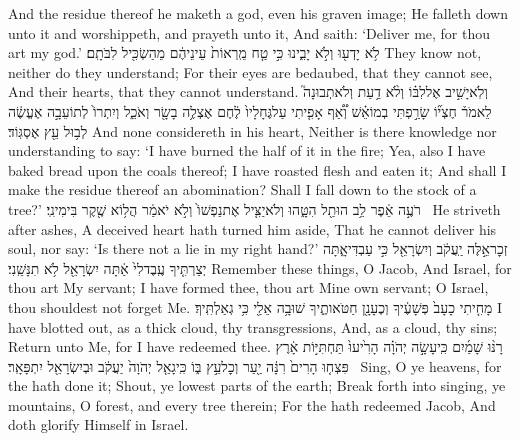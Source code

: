{And the residue thereof he maketh a god, even his graven image; He falleth down unto it and worshippeth, and prayeth unto it, And saith: ‘Deliver me, for thou art my god.’}
{לֹ֥א יָדְע֖וּ וְלֹ֣א יָבִ֑ינוּ כִּ֣י טַ֤ח מֵֽרְאוֹת֙ עֵינֵיהֶ֔ם מֵהַשְׂכִּ֖יל לִבֹּתָֽם׃}
{They know not, neither do they understand; For their eyes are bedaubed, that they cannot see, And their hearts, that they cannot understand.}
{וְלֹֽא\maqqaf יָשִׁ֣יב אֶל\maqqaf לִבּ֗וֹ וְלֹ֨א דַ֥עַת וְלֹא\maqqaf תְבוּנָה֮ לֵאמֹר֒ חֶצְי֞וֹ שָׂרַ֣פְתִּי בְמוֹ\maqqaf אֵ֗שׁ וְ֠אַ֠ף אָפִ֤יתִי עַל\maqqaf גֶּחָלָיו֙ לֶ֔חֶם אֶצְלֶ֥ה בָשָׂ֖ר וְאֹכֵ֑ל וְיִתְרוֹ֙ לְתוֹעֵבָ֣ה אֶעֱשֶׂ֔ה לְב֥וּל עֵ֖ץ אֶסְגּֽוֹד׃}
{And none considereth in his heart, Neither is there knowledge nor understanding to say: ‘I have burned the half of it in the fire; Yea, also I have baked bread upon the coals thereof; I have roasted flesh and eaten it; And shall I make the residue thereof an abomination? Shall I fall down to the stock of a tree?’}
{רֹעֶ֣ה אֵ֔פֶר לֵ֥ב הוּתַ֖ל הִטָּ֑הוּ וְלֹא\maqqaf יַצִּ֤יל אֶת\maqqaf נַפְשׁוֹ֙ וְלֹ֣א יֹאמַ֔ר הֲל֥וֹא שֶׁ֖קֶר בִּימִינִֽי׃ \setuma }
{He striveth after ashes, A deceived heart hath turned him aside, That he cannot deliver his soul, nor say: ‘Is there not a lie in my right hand?’}
{זְכׇר\maqqaf אֵ֣לֶּה יַֽעֲקֹ֔ב וְיִשְׂרָאֵ֖ל כִּ֣י עַבְדִּי\maqqaf אָ֑תָּה יְצַרְתִּ֤יךָ עֶֽבֶד\maqqaf לִי֙ אַ֔תָּה יִשְׂרָאֵ֖ל לֹ֥א תִנָּשֵֽׁנִי׃}
{Remember these things, O Jacob, And Israel, for thou art My servant; I have formed thee, thou art Mine own servant; O Israel, thou shouldest not forget Me.}
{מָחִ֤יתִי כָעָב֙ פְּשָׁעֶ֔יךָ וְכֶעָנָ֖ן חַטֹּאותֶ֑יךָ שׁוּבָ֥ה אֵלַ֖י כִּ֥י גְאַלְתִּֽיךָ׃}
{I have blotted out, as a thick cloud, thy transgressions, And, as a cloud, thy sins; Return unto Me, for I have redeemed thee.}
{רָנּ֨וּ שָׁמַ֜יִם כִּֽי\maqqaf עָשָׂ֣ה יְהֹוָ֗ה הָרִ֙יעוּ֙ תַּחְתִּיּ֣וֹת אָ֔רֶץ פִּצְח֤וּ הָרִים֙ רִנָּ֔ה יַ֖עַר וְכׇל\maqqaf עֵ֣ץ בּ֑וֹ כִּֽי\maqqaf גָאַ֤ל יְהֹוָה֙ יַעֲקֹ֔ב וּבְיִשְׂרָאֵ֖ל יִתְפָּאָֽר׃ \setuma }
{Sing, O ye heavens, for the \lord\space hath done it; Shout, ye lowest parts of the earth; Break forth into singing, ye mountains, O forest, and every tree therein; For the \lord\space hath redeemed Jacob, And doth glorify Himself in Israel.}
\newperek
{}
\label{haft_25}
\setcounter{chap}{7}
\setcounter{verse}{21}
